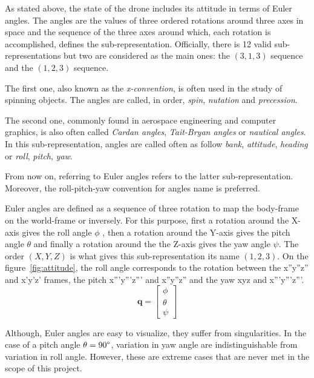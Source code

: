 \documentclass[a4paper, 12pt]{report}
\begin{document}
As stated above, the state of the drone includes its attitude in terms of Euler angles. The angles are the values of three ordered rotations around three axes in space and the sequence of the three axes around which, each rotation is accomplished, defines the sub-representation.  Officially, there is 12 valid sub-representations but two are considered as the main ones: the $(3,1,3)$ sequence and the $(1,2,3)$ sequence.

The first one, also known as the \emph{x-convention}, is often used in the study of spinning objects. The angles are called, in order, \emph{spin}, \emph{nutation} and \emph{precession}.

The second one, commonly found in aerospace engineering and computer graphics, is also often called \emph{Cardan angles}, \emph{Tait-Bryan angles} or \emph{nautical angles}. In this sub-representation, angles are called often as follow \emph{bank}, \emph{attitude}, \emph{heading} or \emph{roll}, \emph{pitch}, \emph{yaw}. 

From now on, referring to Euler angles refers to the latter sub-representation. Moreover, the roll-pitch-yaw convention for angles name is preferred.

Euler angles are defined as a sequence of three rotation to map the body-frame on the world-frame or inversely. For this purpose, first a rotation around the X-axis gives the roll angle $\phi$ , then a rotation around the Y-axis gives the pitch angle $\theta$ and finally a rotation around the the Z-axis gives the yaw angle $\psi$. The order $(X,Y,Z)$ is what gives this sub-representation its name $(1,2,3)$. On the figure~\ref{fig:attitude}, the roll angle corresponds to the rotation between the x''y''z'' and x'y'z' frames, the pitch x'''y'''z''' and x''y''z'' and the yaw xyz and x'''y'''z'''.
\[\boldsymbol{q} =  \begin{bmatrix} \phi \\ \theta \\ \psi \end{bmatrix}\]

Although, Euler angles are easy to visualize, they suffer from singularities. In the case of a pitch angle $\theta=90\degree$, variation in yaw angle are indistinguishable from variation in roll angle. However, these are extreme cases that are never met in the scope of this project.
\end{document}
